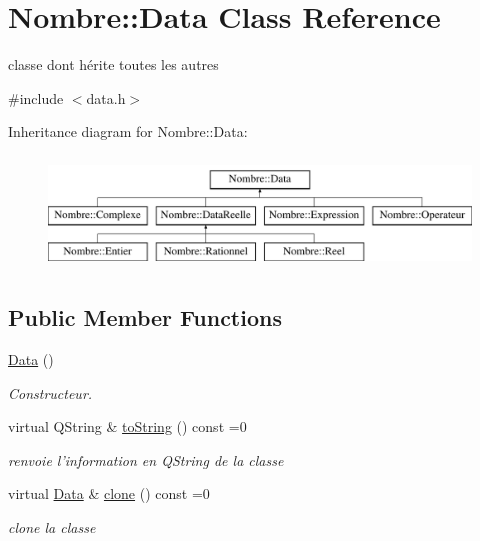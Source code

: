 \hypertarget{classNombre_1_1Data}{
\section{Nombre::Data Class Reference}
\label{classNombre_1_1Data}
}


classe dont hérite toutes les autres  




{\ttfamily \#include $<$data.h$>$}

Inheritance diagram for Nombre::Data:\begin{figure}[H]
\begin{center}
\leavevmode
\includegraphics[height=3cm]{classNombre_1_1Data}
\end{center}
\end{figure}
\subsection*{Public Member Functions}
\begin{DoxyCompactItemize}
\item 
\hyperlink{classNombre_1_1Data_a5ecec0762dd46ac0feecc10d11d622bd}{Data} ()
\begin{DoxyCompactList}\small\item\em Constructeur. \item\end{DoxyCompactList}\item 
\hypertarget{classNombre_1_1Data_a5e1d3b57a2c241ececf01ba5e5c9cf6b}{
virtual QString \& \hyperlink{classNombre_1_1Data_a5e1d3b57a2c241ececf01ba5e5c9cf6b}{toString} () const =0}
\label{classNombre_1_1Data_a5e1d3b57a2c241ececf01ba5e5c9cf6b}

\begin{DoxyCompactList}\small\item\em renvoie l'information en QString de la classe \item\end{DoxyCompactList}\item 
\hypertarget{classNombre_1_1Data_a1f15fd4d8d98e6c8a87744247a019ad7}{
virtual \hyperlink{classNombre_1_1Data}{Data} \& \hyperlink{classNombre_1_1Data_a1f15fd4d8d98e6c8a87744247a019ad7}{clone} () const =0}
\label{classNombre_1_1Data_a1f15fd4d8d98e6c8a87744247a019ad7}

\begin{DoxyCompactList}\small\item\em clone la classe \item\end{DoxyCompactList}\end{DoxyCompactItemize}


